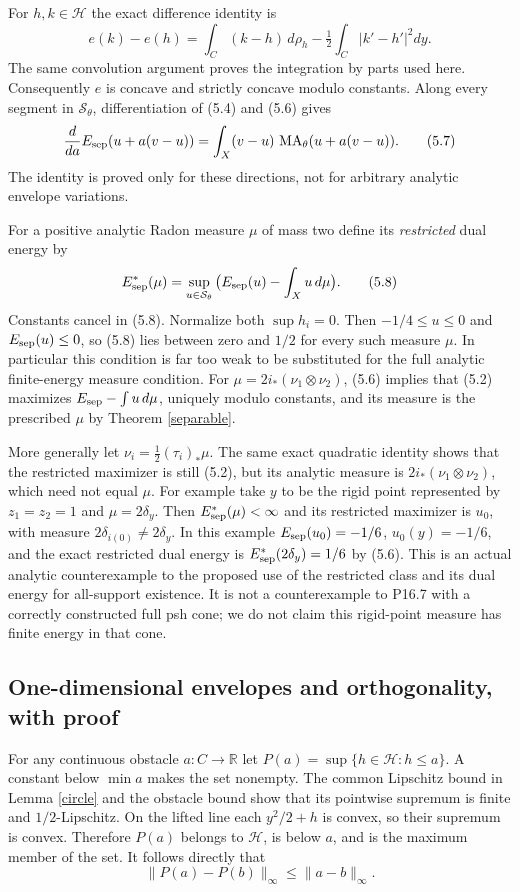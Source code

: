 \documentclass[11pt]{article}
\theoremstyle{definition}\newtheorem{definition}[theorem]{Definition}
\newcommand{\MA}{\operatorname{MA}}
\newcommand{\R}{\mathbb R}
\begin{document}
For $h,k\in\mathcal H$ the exact difference identity is
\[
 e(k)-e(h)=\int_C(k-h)\,d\rho_h
                  -\tfrac12\int_C|k'-h'|^2dy.           \tag{5.6}
\]
The same convolution argument proves the integration by parts used here.
Consequently $e$ is concave and strictly concave modulo constants.
Along every segment in $\mathcal S_\theta$, differentiation of (5.4)
and (5.6) gives
\[
 \frac d{da}E_{\rm sep}(u+a(v-u))
          =\int_X(v-u)\,\MA_\theta(u+a(v-u)).            \tag{5.7}
\]
The identity is proved only for these directions, not for arbitrary
analytic envelope variations.

For a positive analytic Radon measure $\mu$ of mass two define its
\emph{restricted} dual energy by
\[
 E^*_{\rm sep}(\mu)=
 \sup_{u\in\mathcal S_\theta}\big(E_{\rm sep}(u)-\int_Xu\,d\mu\big).
                                                               \tag{5.8}
\]
Constants cancel in (5.8). Normalize both $\sup h_i=0$.
Then $-1/4\le u\le0$ and $E_{\rm sep}(u)\le0$, so (5.8) lies
between zero and $1/2$ for every such measure $\mu$. In particular this
condition is far too weak to be substituted for the full analytic
finite-energy measure condition.
For $\mu=2i_*(\nu_1\otimes\nu_2)$, (5.6) implies that (5.2) maximizes
$E_{\rm sep}-\int u\,d\mu$, uniquely modulo constants, and its
measure is the prescribed $\mu$ by Theorem \ref{separable}.

More generally let $\nu_i=\tfrac12(\tau_i)_*\mu$. The same exact
quadratic identity shows that the restricted maximizer is still (5.2),
but its analytic measure is
$2i_*(\nu_1\otimes\nu_2)$, which need not equal $\mu$.
For example take $y$ to be the rigid point represented by $z_1=z_2=1$
and $\mu=2\delta_y$. Then $E^*_{\rm sep}(\mu)<\infty$ and its
restricted maximizer is $u_0$, with measure $2\delta_{i(0)}\ne2\delta_y$.
In this example $E_{\rm sep}(u_0)=-1/6$, $u_0(y)=-1/6$, and the exact
restricted dual energy is $E^*_{\rm sep}(2\delta_y)=1/6$ by (5.6).
This is an actual analytic counterexample to the proposed use of the
restricted class and its dual energy for all-support existence. It is
not a counterexample to P16.7 with a correctly constructed full psh cone;
we do not claim this rigid-point measure has finite energy in that cone.

\subsection{One-dimensional envelopes and orthogonality, with proof}
For any continuous obstacle $a:C\to\R$ let
$P(a)=\sup\{h\in\mathcal H:h\le a\}$.
A constant below $\min a$ makes the set nonempty. The common Lipschitz
bound in Lemma \ref{circle} and the obstacle bound show that its pointwise
supremum is finite and $1/2$-Lipschitz. On the lifted line each
$y^2/2+h$ is convex, so their supremum is convex. Therefore $P(a)$ belongs
to $\mathcal H$, is below $a$, and is the maximum member of the set.
It follows directly that
\[
 \|P(a)-P(b)\|_\infty\le\|a-b\|_\infty.                \tag{5.9}
\]
\end{document}
